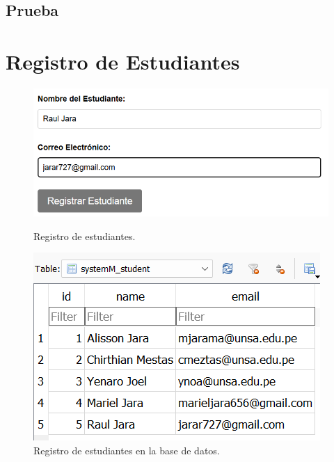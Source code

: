 \documentclass{article}
\begin{document}
\subsection{Prueba}
\section{Registro de Estudiantes}
\begin{figure}[H]
	\centering
	\begin{minipage}{0.6\textwidth}
		\centering
		\includegraphics[width=\linewidth,keepaspectratio]{img/registerStudent.png}
		\caption{Registro de estudiantes.}
	\end{minipage}\hfill
	\begin{minipage}{0.4\textwidth}
		\centering
		\includegraphics[width=\linewidth,keepaspectratio]{img/registerSBD.png}
		\caption{Registro de estudiantes en la base de datos.}
	\end{minipage}
\end{figure}
\end{document}
